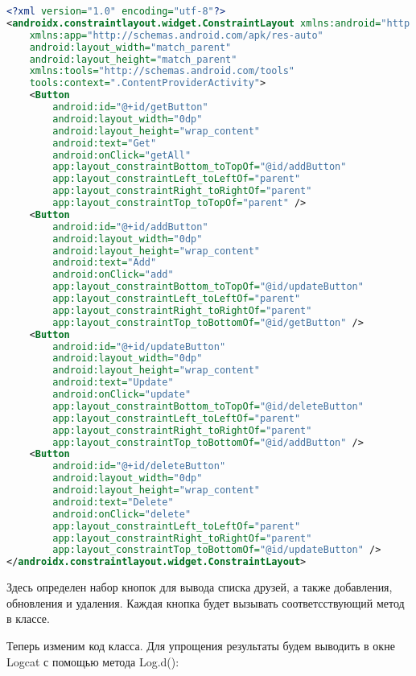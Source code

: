 \begin{lstlisting}[language=XML
	, label=lst:
	]
<?xml version="1.0" encoding="utf-8"?>
<androidx.constraintlayout.widget.ConstraintLayout xmlns:android="http://schemas.android.com/apk/res/android"
    xmlns:app="http://schemas.android.com/apk/res-auto"
    android:layout_width="match_parent"
    android:layout_height="match_parent"
    xmlns:tools="http://schemas.android.com/tools"
    tools:context=".ContentProviderActivity">
    <Button
        android:id="@+id/getButton"
        android:layout_width="0dp"
        android:layout_height="wrap_content"
        android:text="Get"
        android:onClick="getAll"
        app:layout_constraintBottom_toTopOf="@id/addButton"
        app:layout_constraintLeft_toLeftOf="parent"
        app:layout_constraintRight_toRightOf="parent"
        app:layout_constraintTop_toTopOf="parent" />
    <Button
        android:id="@+id/addButton"
        android:layout_width="0dp"
        android:layout_height="wrap_content"
        android:text="Add"
        android:onClick="add"
        app:layout_constraintBottom_toTopOf="@id/updateButton"
        app:layout_constraintLeft_toLeftOf="parent"
        app:layout_constraintRight_toRightOf="parent"
        app:layout_constraintTop_toBottomOf="@id/getButton" />
    <Button
        android:id="@+id/updateButton"
        android:layout_width="0dp"
        android:layout_height="wrap_content"
        android:text="Update"
        android:onClick="update"
        app:layout_constraintBottom_toTopOf="@id/deleteButton"
        app:layout_constraintLeft_toLeftOf="parent"
        app:layout_constraintRight_toRightOf="parent"
        app:layout_constraintTop_toBottomOf="@id/addButton" />
    <Button
        android:id="@+id/deleteButton"
        android:layout_width="0dp"
        android:layout_height="wrap_content"
        android:text="Delete"
        android:onClick="delete"
        app:layout_constraintLeft_toLeftOf="parent"
        app:layout_constraintRight_toRightOf="parent"
        app:layout_constraintTop_toBottomOf="@id/updateButton" />
</androidx.constraintlayout.widget.ConstraintLayout>
\end{lstlisting}

Здесь определен набор кнопок для вывода списка друзей, а также
добавления, обновления и удаления. Каждая кнопка будет вызывать
соответсствующий метод в классе.\par
Теперь изменим код класса. Для упрощения результаты будем
выводить в окне Logcat с помощью метода Log.d():

